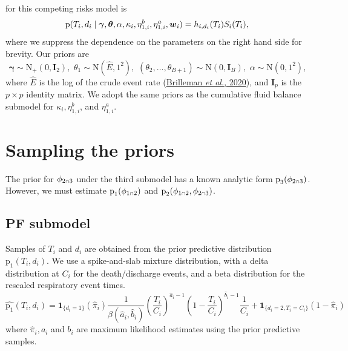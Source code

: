 \documentclass[
  10pt,
  a4paper,
]{article}
\let\Oldcap\cap
\renewcommand{\cap}{\mathrel{\mathsmaller{\Oldcap}}}
\newcommand{\pd}{\text{p}}
\begin{document}
for this competing risks model is \begin{equation}
  \pd(T_{i}, d_{i} \mid \boldsymbol{\gamma}, \boldsymbol{\theta}, \alpha, \kappa_{i}, \eta_{1, i}^{b}, \eta_{1, i}^{a}, \boldsymbol{w}_{i}) = h_{i, d_{i}}(T_{i}) S_{i}(T_{i}), \\
\end{equation} where we suppress the dependence on the parameters on the
right hand side for brevity. Our priors are \begin{equation}
  \boldsymbol{\gamma} \sim \text{N}_{+}(0, \boldsymbol{I}_{2}), \, \,
  \theta_{1} \sim \text{N}(\hat{E}, 1^2), \, \,
  (\theta_{2}, \ldots, \theta_{B + 1}) \sim \text{N}(0, \boldsymbol{I}_{B}), \, \,
  \alpha \sim \text{N}(0, 1^2),
  \label{eqn:surv-submodel-prior-def}
\end{equation} where \(\hat{E}\) is the log of the crude event rate
(\protect\hyperlink{ref-brilleman_bayesian_2020}{Brilleman \emph{et
al.}, 2020}), and \(\boldsymbol{I}_{p}\) is the \(p \times p\) identity
matrix. We adopt the same priors as the cumulative fluid balance
submodel for \(\kappa_{i}, \eta_{1, i}^{b}\), and \(\eta_{1, i}^{a}\).

\hypertarget{sampling-the-priors}{%
\section{Sampling the priors}\label{sampling-the-priors}}

The prior for \(\phi_{2 \cap 3}\) under the third submodel has a known
analytic form \(\pd_{3}(\phi_{2 \cap 3})\). However, we must estimate
\(\pd_{1}(\phi_{1 \cap 2})\) and
\(\pd_{2}(\phi_{1 \cap 2}, \phi_{2 \cap 3})\).

\hypertarget{pf-submodel}{%
\subsection{PF submodel}\label{pf-submodel}}

Samples of \(T_{i}\) and \(d_{i}\) are obtained from the prior
predictive distribution \(\pd_{1}(T_{i}, d_{i})\). We use a
spike-and-slab mixture distribution, with a delta distribution at
\(C_{i}\) for the death/discharge events, and a beta distribution for
the rescaled respiratory event times. \begin{equation}
  \widehat{\pd_{1}}(T_{i}, d_{i}) =
    \boldsymbol{1}_{\{d_{i} = 1\}} (\widehat{\pi}_{i}) \frac{1}{\beta\left(\widehat{a}_{i}, \widehat{b}_{i}\right)} \left(\frac{T_{i}}{C_{i}}\right)^{\widehat{a}_{i} - 1} \left(1 - \frac{T_{i}}{C_{i}}\right)^{\widehat{b}_{i} - 1} \frac{1}{C_{i}} +
    \boldsymbol{1}_{\{d_{i} = 2, T_{i} = C_{i}\}} (1 - \widehat{\pi}_{i})
  \label{eqn:pf-event-time-prior-dist}
\end{equation} where \(\widehat{\pi}_{i}, a_{i}\) and \(b_{i}\) are
maximum likelihood estimates using the prior predictive samples.
\end{document}
